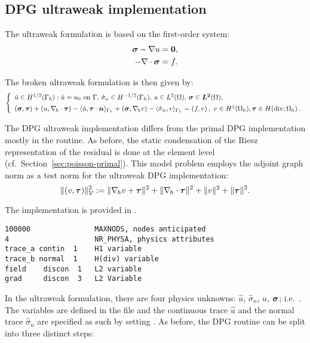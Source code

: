 %
%


\subsection{DPG ultraweak implementation}
\label{sec:poisson-ultraweak}

The ultraweak formulation is based on the first-order system:
\begin{align*}
	\boldsymbol \sigma - \nabla u &= \boldsymbol 0 , \\
	- \nabla \cdot \boldsymbol \sigma &= f .
\end{align*}

The broken ultraweak formulation is then given by:
\[
\left\{
\begin{array}{llll}
	\hat u \in H^{1/2}(\Gamma_h): \hat u = u_0 \text{ on } \Gamma,\,
	\hat{\sigma}_n \in H^{-1/2}(\Gamma_h),\,
	u \in L^2(\Omega),\,
	\boldsymbol \sigma \in \boldsymbol{L^2}(\Omega) , \\[5pt]
	(\boldsymbol \sigma, \boldsymbol \tau) + (u, \nabla_{\hskip -1pt h} \cdot \boldsymbol \tau)
	- \langle \hat u, \boldsymbol \tau \cdot \boldsymbol n \rangle_{\Gamma_h}
	+ (\boldsymbol \sigma, \nabla_{\hskip -1pt h} v)
	- \langle \hat{\sigma}_n , v \rangle_{\Gamma_h}
	= (f,v) \, , \
	v \in H^1(\Omega_h), 
	\boldsymbol \tau \in H(\text{div}; \Omega_h) \, .
\end{array}
\right.
\]

The DPG ultraweak implementation differs from the primal DPG implementation mostly in the  routine. As before, the static condensation of the Riesz representation of the residual is done at the element level (cf.~Section~\ref{sec:poisson-primal}). This model problem employs the adjoint graph norm as a test norm for the ultraweak DPG implementation:
\[
	\| (v,\boldsymbol \tau) \|^2_{\mathcal{V}} := 
	\| \nabla_{\hskip -1pt h} v + \boldsymbol \tau \|^2 + \| \nabla_{\hskip -1pt h} \cdot \boldsymbol \tau \|^2
	+ \| v \|^2 + \| \boldsymbol \tau \|^2 .
\]

The implementation is provided in .

\begin{lstlisting}[caption=\file{POISSON/ULTRAWEAK\_DPG/input/physics} input file.]
100000               MAXNODS, nodes anticipated
4                    NR_PHYSA, physics attributes
trace_a contin  1    H1 variable
trace_b normal  1    H(div) variable
field    discon  1   L2 variable
grad     discon  3   L2 Variable
\end{lstlisting}

In the ultraweak formulation, there are four physics unknowns: $\hat u$, $\hat{\sigma}_n$, $u$, $\boldsymbol \sigma$; i.e.~. The variables are defined in the  file and the continuous trace $\hat u$ and the normal trace $\hat \sigma_n$ are specified as such by setting . As before, the DPG  routine can be split into three distinct steps:

